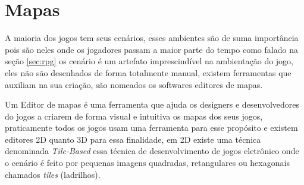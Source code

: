 \section{Mapas}
\label{sec-mapas}

A maioria dos jogos tem seus cenários, esses ambientes são de suma importância pois são neles onde os jogadores passam a maior parte do tempo como falado na seção \ref{sec:rpg} os cenário é um artefato imprescindível na ambientação do jogo, eles não são desenhados de forma totalmente manual, existem ferramentas que auxiliam na sua criação, são nomeados os softwares editores de mapas.

Um Editor de mapas é uma ferramenta que ajuda os designers e desenvolvedores do jogos a criarem de forma visual e intuitiva os mapas dos seus jogos, praticamente todos os jogos usam uma ferramenta para esse propósito e existem editores 2D quanto 3D para essa finalidade, em 2D existe uma técnica denominada \textit{Tile-Based} essa técnica de desenvolvimento de jogos eletrônico onde o cenário é feito por pequenas imagens quadradas, retangulares ou hexagonais chamados \textit{tiles} (ladrilhos).

